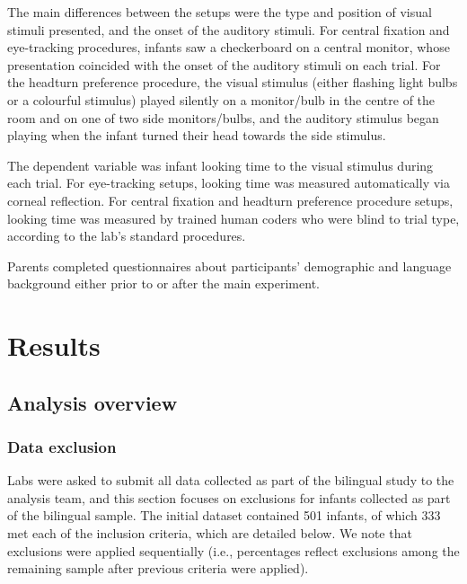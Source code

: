 \documentclass[
  english,
  ,man,floatsintext]{apa6}
\begin{document}
The main differences between the setups were the type and position of visual stimuli presented, and the onset of the auditory stimuli. For central fixation and eye-tracking procedures, infants saw a checkerboard on a central monitor, whose presentation coincided with the onset of the auditory stimuli on each trial. For the headturn preference procedure, the visual stimulus (either flashing light bulbs or a colourful stimulus) played silently on a monitor/bulb in the centre of the room and on one of two side monitors/bulbs, and the auditory stimulus began playing when the infant turned their head towards the side stimulus.

The dependent variable was infant looking time to the visual stimulus during each trial. For eye-tracking setups, looking time was measured automatically via corneal reflection. For central fixation and headturn preference procedure setups, looking time was measured by trained human coders who were blind to trial type, according to the lab's standard procedures.

Parents completed questionnaires about participants' demographic and language background either prior to or after the main experiment.

\hypertarget{results}{%
\section{Results}\label{results}}

\hypertarget{analysis-overview}{%
\subsection{Analysis overview}\label{analysis-overview}}

\hypertarget{data-exclusion}{%
\subsubsection{Data exclusion}\label{data-exclusion}}

Labs were asked to submit all data collected as part of the bilingual study to the analysis team, and this section focuses on exclusions for infants collected as part of the bilingual sample. The initial dataset contained 501 infants, of which 333 met each of the inclusion criteria, which are detailed below. We note that exclusions were applied sequentially (i.e., percentages reflect exclusions among the remaining sample after previous criteria were applied).
\end{document}
